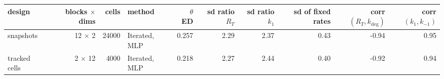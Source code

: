 \begin{tabular}{lrrlrrrrrr}
\toprule
design & blocks $\times$ dims & cells & method & $\theta$ ED & sd ratio $R_T$ & sd ratio $k_1$ & sd of fixed rates & corr$(R_T, k_\mathrm{deg})$ & corr$(k_1, k_{-1})$ \\
\midrule
snapshots & 12 $\times$ 2 & 24000 & Iterated, MLP & 0.257 & 2.29 & 2.37 & 0.43 & -0.94 & 0.95 \\
tracked cells & 2 $\times$ 12 & 4000 & Iterated, MLP & 0.218 & 2.27 & 2.44 & 0.40 & -0.92 & 0.94 \\
\bottomrule
\end{tabular}
